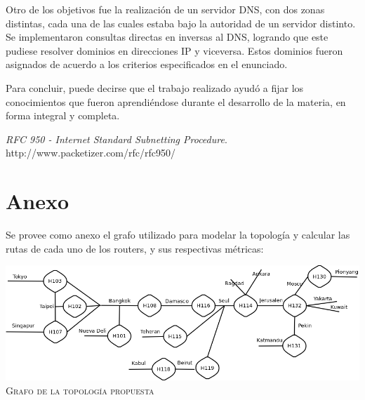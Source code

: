 \documentclass[12pt,titlepage]{article}
\begin{document}
Otro de los objetivos fue la realizaci\'on de un servidor DNS, con dos zonas distintas, cada una de las cuales estaba bajo la autoridad de un servidor distinto. Se implementaron consultas directas en inversas al DNS, logrando que este pudiese resolver dominios en direcciones IP y viceversa. Estos dominios fueron asignados de acuerdo a los criterios especificados en el enunciado.

Para concluir, puede decirse que el trabajo realizado ayud\'o a fijar los conocimientos que fueron aprendi\'endose durante el desarrollo de la materia, en forma integral y completa.


\newpage

\begin{thebibliography}{9}

  \emph{RFC 950 - Internet Standard Subnetting Procedure}. \\
  http://www.packetizer.com/rfc/rfc950/

\end{thebibliography}

\newpage
\section{Anexo}
Se provee como anexo el grafo utilizado para modelar la topolog\'ia y calcular las rutas de cada uno de los routers, y sus respectivas m\'etricas:

\begin{center}
\includegraphics[scale=0.3]{./grafo}\\
\small{\textsc{Grafo de la topolog\'ia propuesta}}\\
\end{center}

\end{document}
